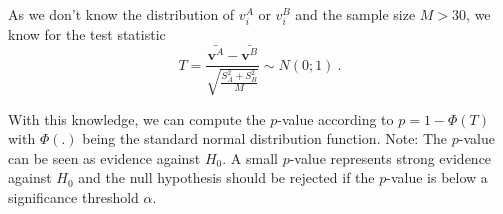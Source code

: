 As we don't know the distribution of $v^A_i$ or $v^B_i$ and the sample size $M > 30$, we know for the test statistic
$$T = \frac{\bar{\mathbf{v}^A} - \bar{\mathbf{v}^B}}{\sqrt{\frac{S_A^2 + S_B^2}{M}}} \sim N(0; 1)~.$$

With this knowledge, we can compute the $p$-value according to $p = 1 - \Phi(T)$ with $\Phi(.)$ being the standard normal distribution function. Note: The $p$-value can be seen as evidence against $H_0$. A small $p$-value represents strong evidence against $H_0$ and the null hypothesis should be rejected if the $p$-value is below a significance threshold $\alpha$.

